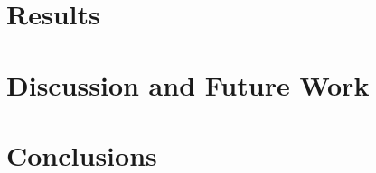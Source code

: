 \documentclass[journal]{vgtc}                %
\begin{document}
\begin{table}[b]
\begin{tabular}{p{0.18\linewidth}p{0.5\linewidth}p{0.12\linewidth}p{0.12\linewidth}}
  \end{tabular}
\end{table}

\section{Results}
\section{Discussion and Future Work}
\section{Conclusions}



%
%
%

%


\end{document}

